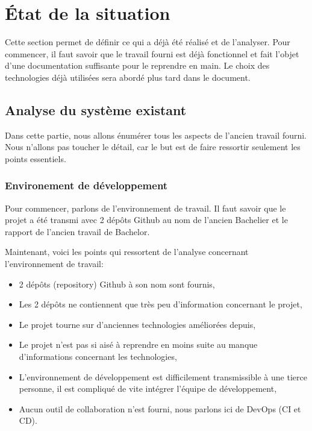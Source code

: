 \documentclass[
    iai, %
    il, %
]{heig-tb}
\begin{document}
\section{État de la situation}
Cette section permet de définir ce qui a déjà été réalisé et de l'analyser.\newline
Pour commencer, il faut savoir que le travail fourni est déjà fonctionnel et fait l'objet d'une documentation suffisante pour le reprendre en main.\newline
Le choix des technologies déjà utilisées sera abordé plus tard dans le document.

\subsection{Analyse du système existant}
Dans cette partie, nous allons énumérer tous les aspects de l'ancien travail fourni. Nous n'allons pas toucher le détail, car le but est de faire ressortir seulement les points essentiels.

\subsubsection{Environement de développement}
Pour commencer, parlons de l'environnement de travail. Il faut savoir que le projet a été transmi avec 2 dépôts Github au nom de l'ancien Bachelier et le rapport de l'ancien travail de Bachelor.

Maintenant, voici les points qui ressortent de l'analyse concernant l'environnement de travail:
\begin{itemize}
    \item 2 dépôts (repository) Github à son nom sont fournis,
    \item Les 2 dépôts ne contiennent que très peu d'information concernant le projet,
    \item Le projet tourne sur d'anciennes technologies améliorées depuis,
    \item Le projet n'est pas si aisé à reprendre en moins suite au manque d'informations concernant les technologies,
    \item L'environnement de développement est difficilement transmissible à une tierce personne, il est compliqué de vite intégrer l'équipe de développement,
    \item Aucun outil de collaboration n'est fourni, nous parlons ici de DevOps (CI et CD).
\end{itemize}
\end{document}
